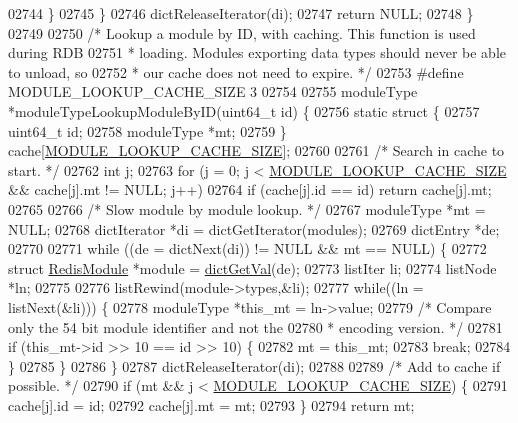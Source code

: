 \begin{DoxyCode}
{{{02744         \}
02745     \}
02746     dictReleaseIterator(di);
02747     \textcolor{keywordflow}{return} NULL;
02748 \}
02749 
02750 \textcolor{comment}{/* Lookup a module by ID, with caching. This function is used during RDB}
02751 \textcolor{comment}{ * loading. Modules exporting data types should never be able to unload, so}
02752 \textcolor{comment}{ * our cache does not need to expire. */}
02753 \textcolor{preprocessor}{#}\textcolor{preprocessor}{define} \textcolor{preprocessor}{MODULE\_LOOKUP\_CACHE\_SIZE} 3
02754 
02755 moduleType *moduleTypeLookupModuleByID(uint64\_t id) \{
02756     \textcolor{keyword}{static} \textcolor{keyword}{struct} \{
02757         uint64\_t id;
02758         moduleType *mt;
02759     \} cache[\hyperlink{module_8c_a7eaacbbffb61183eeb647383f95d8cf4}{MODULE\_LOOKUP\_CACHE\_SIZE}];
02760 
02761     \textcolor{comment}{/* Search in cache to start. */}
02762     \textcolor{keywordtype}{int} j;
02763     \textcolor{keywordflow}{for} (j = 0; j < \hyperlink{module_8c_a7eaacbbffb61183eeb647383f95d8cf4}{MODULE\_LOOKUP\_CACHE\_SIZE} && cache[j].mt != NULL; j++)
02764         \textcolor{keywordflow}{if} (cache[j].id == id) \textcolor{keywordflow}{return} cache[j].mt;
02765 
02766     \textcolor{comment}{/* Slow module by module lookup. */}
02767     moduleType *mt = NULL;
02768     dictIterator *di = dictGetIterator(modules);
02769     dictEntry *de;
02770 
02771     \textcolor{keywordflow}{while} ((de = dictNext(di)) != NULL && mt == NULL) \{
02772         \textcolor{keyword}{struct} \hyperlink{structRedisModule}{RedisModule} *module = \hyperlink{dict_8h_ae8d2cc391873b2bea2b87c4f80f43120}{dictGetVal}(de);
02773         listIter li;
02774         listNode *ln;
02775 
02776         listRewind(module->types,&li);
02777         \textcolor{keywordflow}{while}((ln = listNext(&li))) \{
02778             moduleType *this\_mt = ln->value;
02779             \textcolor{comment}{/* Compare only the 54 bit module identifier and not the}
02780 \textcolor{comment}{             * encoding version. */}
02781             \textcolor{keywordflow}{if} (this\_mt->id >> 10 == id >> 10) \{
02782                 mt = this\_mt;
02783                 \textcolor{keywordflow}{break};
02784             \}
02785         \}
02786     \}
02787     dictReleaseIterator(di);
02788 
02789     \textcolor{comment}{/* Add to cache if possible. */}
02790     \textcolor{keywordflow}{if} (mt && j < \hyperlink{module_8c_a7eaacbbffb61183eeb647383f95d8cf4}{MODULE\_LOOKUP\_CACHE\_SIZE}) \{
02791         cache[j].id = id;
02792         cache[j].mt = mt;
02793     \}
02794     \textcolor{keywordflow}{return} mt;
}}}
\end{DoxyCode}

